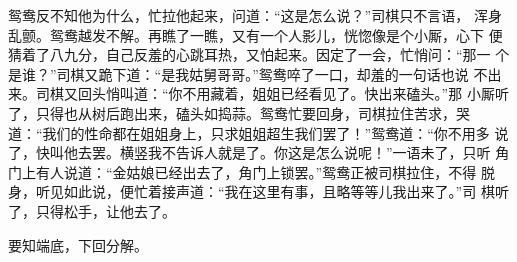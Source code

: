 鸳鸯反不知他为什么，忙拉他起来，问道：“这是怎么说？”司棋只不言语，
浑身乱颤。鸳鸯越发不解。再瞧了一瞧，又有一个人影儿，恍惚像是个小厮，心下
便猜着了八九分，自己反羞的心跳耳热，又怕起来。因定了一会，忙悄问：“那一
个是谁？”司棋又跪下道：“是我姑舅哥哥。”鸳鸯啐了一口，却羞的一句话也说
不出来。司棋又回头悄叫道：“你不用藏着，姐姐已经看见了。快出来磕头。”那
小厮听了，只得也从树后跑出来，磕头如捣蒜。鸳鸯忙要回身，司棋拉住苦求，哭
道：“我们的性命都在姐姐身上，只求姐姐超生我们罢了！”鸳鸯道：“你不用多
说了，快叫他去罢。横竖我不告诉人就是了。你这是怎么说呢！”一语未了，只听
角门上有人说道：“金姑娘已经出去了，角门上锁罢。”鸳鸯正被司棋拉住，不得
脱身，听见如此说，便忙着接声道：“我在这里有事，且略等等儿我出来了。”司
棋听了，只得松手，让他去了。

要知端底，下回分解。